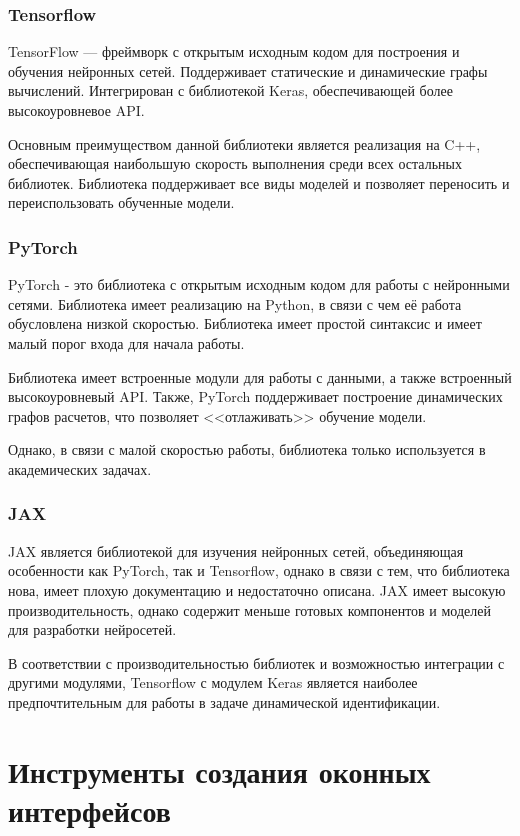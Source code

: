 \subsubsection{Tensorflow}

TensorFlow — фреймворк с открытым исходным кодом для построения и обучения
нейронных сетей. Поддерживает статические и динамические графы вычислений.
Интегрирован с библиотекой Keras, обеспечивающей более высокоуровневое API. 

Основным преимуществом данной библиотеки является реализация на C++,
обеспечивающая наибольшую скорость выполнения среди всех остальных библиотек.
Библиотека поддерживает все виды моделей и позволяет переносить и
переиспользовать обученные модели. 

\subsubsection{PyTorch}

PyTorch - это библиотека с открытым исходным кодом для работы с нейронными
сетями. Библиотека имеет реализацию на Python, в связи с чем её работа
обусловлена низкой скоростью. Библиотека имеет простой синтаксис и имеет малый
порог входа для начала работы. 

Библиотека имеет встроенные модули для работы с данными, а также встроенный
высокоуровневый API. Также, PyTorch поддерживает построение динамических графов
расчетов, что позволяет <<отлаживать>> обучение модели. 

Однако, в связи с малой скоростью работы, библиотека только используется в
академических задачах. 

\subsubsection{JAX}

JAX является библиотекой для изучения нейронных сетей, объединяющая особенности
как PyTorch, так и Tensorflow, однако в связи с тем, что библиотека нова, имеет
плохую документацию и недостаточно описана. JAX имеет высокую
производительность, однако содержит меньше готовых компонентов и моделей для
разработки нейросетей. 

В соответствии с производительностью библиотек и возможностью интеграции с
другими модулями, Tensorflow с модулем Keras является наиболее предпочтительным
для работы в задаче динамической идентификации. 

\section{Инструменты создания оконных интерфейсов}

